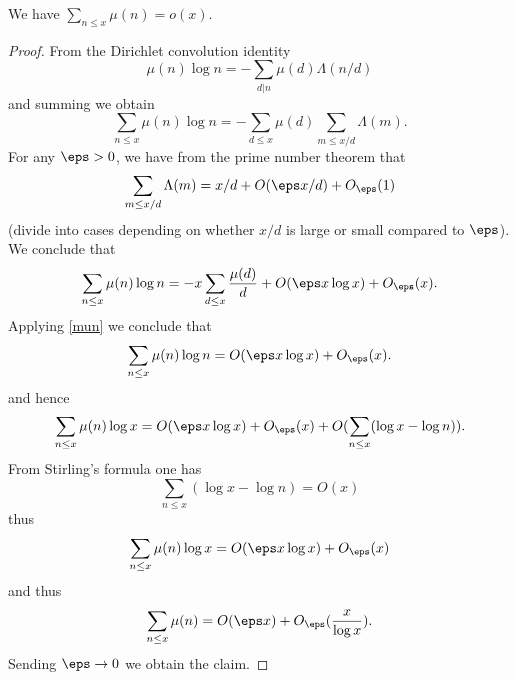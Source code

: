 \begin{proposition}
\label{mu-pnt}
\leanok
We have $\sum_{n \leq x} \mu(n) = o(x)$.
\end{proposition}
\begin{proof}
\leanok
From the Dirichlet convolution identity
    $$ \mu(n) \log n = - \sum_{d|n} \mu(d) \Lambda(n/d)$$
  and summing we obtain
  $$ \sum_{n \leq x} \mu(n) \log n = - \sum_{d \leq x} \mu(d) \sum_{m \leq x/d} \Lambda(m).$$
  For any $\eps>0$, we have from the prime number theorem that
  $$ \sum_{m \leq x/d} \Lambda(m) = x/d + O(\eps x/d) + O_\eps(1)$$
  (divide into cases depending on whether $x/d$ is large or small compared to $\eps$).
  We conclude that
  $$ \sum_{n \leq x} \mu(n) \log n
    = - x \sum_{d \leq x} \frac{\mu(d)}{d} + O(\eps x \log x) + O_\eps(x).$$
  Applying \eqref{mun} we conclude that
  $$ \sum_{n \leq x} \mu(n) \log n = O(\eps x \log x) + O_\eps(x).$$
  and hence
  $$ \sum_{n \leq x} \mu(n) \log x
    = O(\eps x \log x) + O_\eps(x) + O( \sum_{n \leq x} (\log x - \log n) ).$$
  From Stirling's formula one has
  $$  \sum_{n \leq x} (\log x - \log n) = O(x)$$
  thus
  $$ \sum_{n \leq x} \mu(n) \log x = O(\eps x \log x) + O_\eps(x)$$
  and thus
  $$ \sum_{n \leq x} \mu(n) = O(\eps x) + O_\eps(\frac{x}{\log x}).$$
  Sending $\eps \to 0$ we obtain the claim.
\end{proof}
